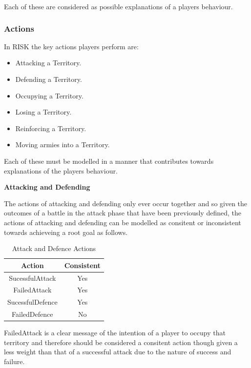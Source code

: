 \documentclass[parskip]{cs4rep}
\begin{document}
Each of these are considered as possible explanations of a players behaviour.

\subsubsection{Actions}

In RISK the key actions players perform are:

\begin{itemize}
\item
Attacking a Territory.
\item
Defending a Territory.
\item
Occupying a Territory.
\item
Losing a Territory.
\item
Reinforcing a Territory.
\item
Moving armies into a Territory.
\newline
\end{itemize}

Each of these must be modelled in a manner that contributes towards explanations of the players behaviour.

\textbf{Attacking and Defending}

The actions of attacking and defending only ever occur together and so given the outcomes of a battle in the attack phase that have been previously defined, the actions of attacking and defending can be modelled as consitent or inconsistent towards achieveing a root goal as follows.

\begin{table}[ht]
\centering
\begin{tabular}{|c|c|}
\hline 
\textbf{Action} & \textbf{Consistent} \\ 
\hline 
SucessfulAttack & Yes \\ 
\hline 
FailedAttack & Yes \\ 
\hline 
SucessfulDefence & Yes \\ 
\hline 
FailedDefence & No \\ 
\hline 
\end{tabular}
\caption{Attack and Defence Actions}
\label{table:att_def_actions}
\end{table}

FailedAttack is a clear message of the intention of a player to occupy that territory and therefore should be considered a consitent action though given a less weight than that of a successful attack due to the nature of success and failure.
\end{document}
